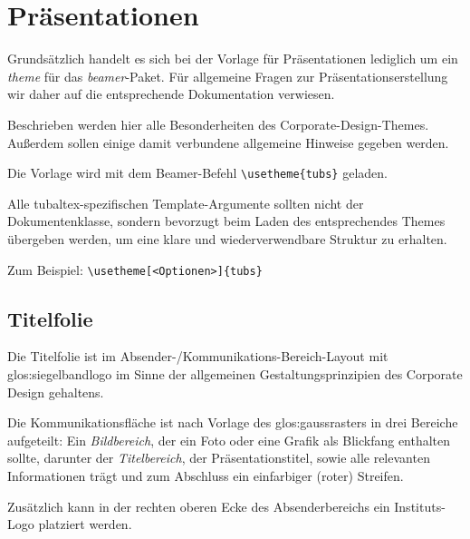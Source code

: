 \chapter{Präsentationen}


Grundsätzlich handelt es sich bei der Vorlage für Präsentationen lediglich um
ein \emph{theme} für das \emph{beamer}-Paket.
Für allgemeine Fragen zur Präsentationserstellung wir daher auf die
entsprechende Dokumentation\cite{beamer} verwiesen.

Beschrieben werden hier alle Besonderheiten des Corporate-Design-Themes.
Außerdem sollen einige damit verbundene allgemeine Hinweise gegeben werden.

Die Vorlage wird mit dem Beamer-Befehl \lstinline!\usetheme{tubs}! geladen.

\begin{hint}\sloppy
  Alle tubaltex-spezifischen Template-Argumente sollten nicht der Dokumentenklasse,
  sondern bevorzugt beim Laden des entsprechendes Themes übergeben werden,
  um eine klare und wiederverwendbare Struktur zu erhalten.
  
  Zum Beispiel: \lstinline!\usetheme[<Optionen>]{tubs}!
\end{hint}
  

\section{Titelfolie}\label{sec:titelfolie}

Die Titelfolie ist im Absender-/Kommunikations-Bereich-Layout mit
\gls{glos:siegelbandlogo} im Sinne der allgemeinen Gestaltungsprinzipien des
Corporate Design gehaltens.

Die Kommunikationsfläche ist nach Vorlage des \gls{glos:gaussraster}s
in drei Bereiche aufgeteilt:
Ein \emph{Bildbereich}, der ein Foto oder eine Grafik als Blickfang enthalten
sollte, darunter der \emph{Titelbereich}, der Präsentationstitel,
sowie alle relevanten Informationen trägt
und zum Abschluss ein einfarbiger (roter) Streifen.

Zusätzlich kann in der rechten oberen Ecke des Absenderbereichs ein
Instituts-Logo platziert werden.

